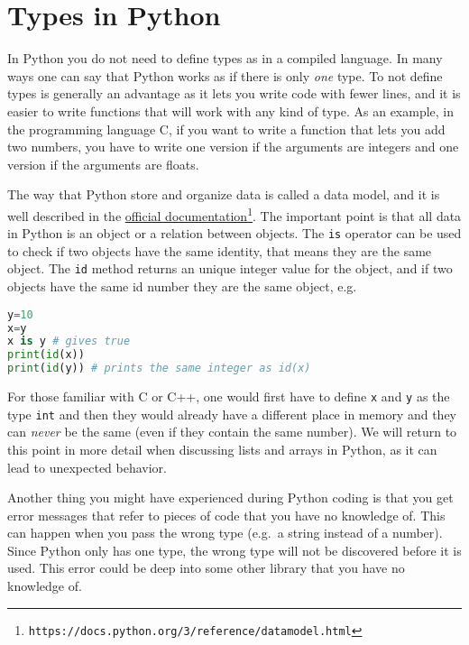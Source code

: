 \documentclass[graybox,sectrefs,envcountresetchap,open=right,final]{svmonodo}
\begin{document}
\section{Types in Python}
In Python you do not need to define types as in a compiled language. In many ways one can say that Python works as if there is only \emph{one} type.  To not define types is generally an advantage as it lets you write code with fewer lines, and it is easier to write functions that will work with any kind of type. As an example, in the programming language C, if you want to write a function that lets you add two numbers, you have to write one version if the arguments are integers and one version if the arguments are floats.

The way that Python store and organize data is called a data model, and it is well described in the \href{{https://docs.python.org/3/reference/datamodel.html}}{official documentation}\footnote{\texttt{https://docs.python.org/3/reference/datamodel.html}}. The important point is that all data in Python is an object or a relation between objects. The \texttt{is} operator can be used to check if two objects have the same identity, that means they are the same object. The \texttt{id} method returns an unique integer value for the object, and if two objects have the same id number they are the same object, e.g.






\begin{lstlisting}[language=python,style=blue1bar]
y=10
x=y
x is y # gives true
print(id(x))
print(id(y)) # prints the same integer as id(x)

\end{lstlisting}

For those familiar with C or C++, one would first have to define \texttt{x} and \texttt{y} as the type \texttt{int} and then they would already have a different place in memory and they can \emph{never} be the same (even if they contain the same number). We will return to this point in more detail when discussing lists and arrays in Python, as it can lead to unexpected behavior.

Another thing you might have experienced during Python coding is that you get error messages that refer to pieces of code that you have no knowledge of. This can happen when you pass the wrong type (e.g.~a string instead of a number). Since Python only has one type, the wrong type will not be discovered before it is used. This error could be deep into some other library that you have no knowledge of. 
\end{document}
